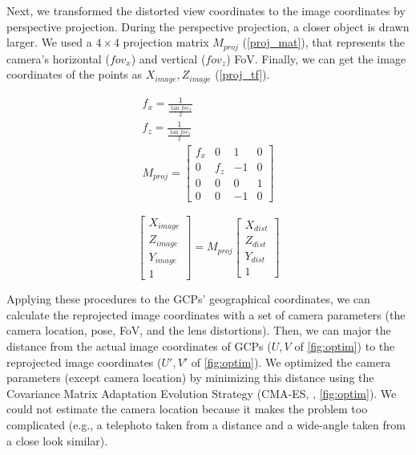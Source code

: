\documentclass{article}
\begin{document}
Next, we transformed the distorted view coordinates to the image coordinates by perspective projection. During the perspective projection, a closer object is drawn larger. We used a \(4 \times 4\) projection matrix \(M_{proj}\) (\ref{proj_mat}), that represents the camera's horizontal (\(fov_x\)) and vertical (\(fov_z\)) FoV. Finally, we can get the image coordinates of the points as \(X_{image}, Z_{image}\) (\ref{proj_tf}).

\label{proj_mat}
\begin{gather}
  f_x = \frac{1}{\frac{\tan fov_x}{2}} \\
  f_z = \frac{1}{\frac{\tan fov_z}{2}} \\
  M_{proj} = 
  \begin{bmatrix} 
    f_x & 0 & 1 & 0\\ 
    0 & f_z & -1 & 0 \\ 
    0 & 0 & 0 & 1\\ 
    0 & 0 & -1 & 0 
  \end{bmatrix}
\end{gather}

\label{proj_tf}
\begin{equation}
  \begin{bmatrix} 
    X_{image} \\ Z_{image} \\ Y_{image} \\ 1 
  \end{bmatrix}
  =
  M_{proj}
  \begin{bmatrix} 
    X_{dist} \\ Z_{dist} \\ Y_{dist} \\ 1 
  \end{bmatrix}
\end{equation}

Applying these procedures to the GCPs' geographical coordinates, we can calculate the reprojected image coordinates with a set of camera parameters (the camera location, pose, FoV, and the lens distortions). Then, we can major the distance from the actual image coordinates of GCPs (\(U, V\) of \ref{fig:optim}) to the reprojected image coordinates (\(U', V'\) of \ref{fig:optim}). We optimized the camera parameters (except camera location) by minimizing this distance using the Covariance Matrix Adaptation Evolution Strategy (CMA-ES, \cite{Hansen2003CMAES}, \ref{fig:optim}). We could not estimate the camera location because it makes the problem too complicated (e.g., a telephoto taken from a distance and a wide-angle taken from a close look similar).
\end{document}
